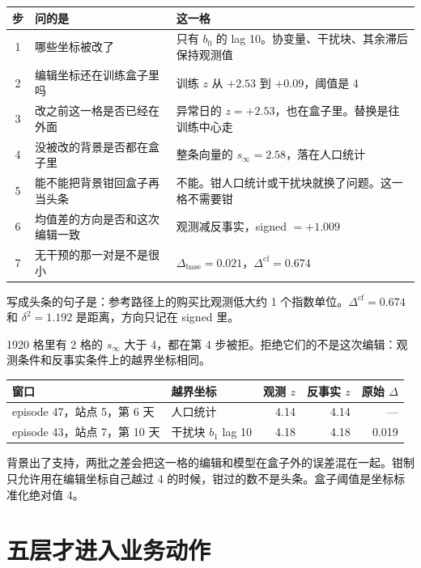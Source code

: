 \documentclass[11pt]{article}
\begin{document}
\begin{center}
\small
\begin{tabular}{@{}clp{}@{}}
\toprule
步 & 问的是 & 这一格 \\
\midrule
1 & 哪些坐标被改了 & 只有 \(b_0\) 的 lag 10。协变量、干扰块、其余滞后保持观测值 \\
2 & 编辑坐标还在训练盒子里吗 & 训练 \(z\) 从 \(+2.53\) 到 \(+0.09\)，阈值是 4 \\
3 & 改之前这一格是否已经在外面 & 异常日的 \(z=+2.53\)，也在盒子里。替换是往训练中心走 \\
4 & 没被改的背景是否都在盒子里 & 整条向量的 \(s_\infty=2.58\)，落在人口统计 \\
5 & 能不能把背景钳回盒子再当头条 & 不能。钳人口统计或干扰块就换了问题。这一格不需要钳 \\
6 & 均值差的方向是否和这次编辑一致 & 观测减反事实，signed \(=+1.009\) \\
7 & 无干预的那一对是不是很小 & \(\Delta_{\mathrm{base}}=0.021\)，\(\Delta^{\mathrm{cf}}=0.674\) \\
\bottomrule
\end{tabular}
\end{center}

写成头条的句子是：参考路径上的购买比观测低大约 1 个指数单位。\(\Delta^{\mathrm{cf}}=0.674\) 和 \(\delta^{2}=1.192\) 是距离，方向只记在 signed 里。

1920 格里有 2 格的 \(s_\infty\) 大于 4，都在第 4 步被拒。拒绝它们的不是这次编辑：观测条件和反事实条件上的越界坐标相同。

\begin{center}
\small
\begin{tabular}{@{}llrrr@{}}
\toprule
窗口 & 越界坐标 & 观测 \(z\) & 反事实 \(z\) & 原始 \(\Delta\) \\
\midrule
episode 47，站点 5，第 6 天 & 人口统计 & 4.14 & 4.14 & --- \\
episode 43，站点 7，第 10 天 & 干扰块 \(b_1\) lag 10 & 4.18 & 4.18 & 0.019 \\
\bottomrule
\end{tabular}
\end{center}

背景出了支持，两批之差会把这一格的编辑和模型在盒子外的误差混在一起。钳制只允许用在编辑坐标自己越过 4 的时候，钳过的数不是头条。盒子阈值是坐标标准化绝对值 4。

\section{五层才进入业务动作}
\end{document}
